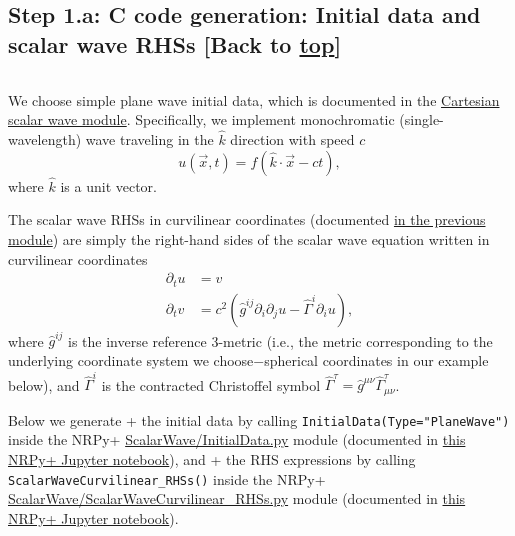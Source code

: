 \documentclass[landscape,letterpaper,10pt,english]{article}
\begin{document}
\[\label{writec}\]

    \hypertarget{step-1.a-c-code-generation-initial-data-and-scalar-wave-rhss-back-to-top}{%
\subsection{\texorpdfstring{Step 1.a: C code generation: Initial data
and scalar wave RHSs {[}Back to
\hyperref[toc]{top}{]}}{Step 1.a: C code generation: Initial data and scalar wave RHSs {[}Back to {]}}}\label{step-1.a-c-code-generation-initial-data-and-scalar-wave-rhss-back-to-top}}

\[\label{id_rhss}\]

We choose simple plane wave initial data, which is documented in the
\href{Tutorial-ScalarWave.ipynb}{Cartesian scalar wave module}.
Specifically, we implement monochromatic (single-wavelength) wave
traveling in the \(\hat{k}\) direction with speed \(c\)
\[u(\vec{x},t) = f(\hat{k}\cdot\vec{x} - c t),\] where \(\hat{k}\) is a
unit vector.

The scalar wave RHSs in curvilinear coordinates (documented
\href{Tutorial-ScalarWaveCurvilinear.ipynb}{in the previous module}) are
simply the right-hand sides of the scalar wave equation written in
curvilinear coordinates \begin{align}
\partial_t u &= v \\
\partial_t v &= c^2 \left(\hat{g}^{ij} \partial_{i} \partial_{j} u - \hat{\Gamma}^i \partial_i u\right),
\end{align} where \(\hat{g}^{ij}\) is the inverse reference 3-metric
(i.e., the metric corresponding to the underlying coordinate system we
choose\(-\)spherical coordinates in our example below), and
\(\hat{\Gamma}^i\) is the contracted Christoffel symbol
\(\hat{\Gamma}^\tau = \hat{g}^{\mu\nu} \hat{\Gamma}^\tau_{\mu\nu}\).

Below we generate + the initial data by calling
\texttt{InitialData(Type="PlaneWave")} inside the NRPy+
\href{../edit/ScalarWave/InitialData.py}{ScalarWave/InitialData.py}
module (documented in \href{Tutorial-ScalarWave.ipynb}{this NRPy+
Jupyter notebook}), and + the RHS expressions by calling
\texttt{ScalarWaveCurvilinear\_RHSs()} inside the NRPy+
\href{../edit/ScalarWave/ScalarWaveCurvilinear_RHSs.py}{ScalarWave/ScalarWaveCurvilinear\_RHSs.py}
module (documented in \href{Tutorial-ScalarWaveCurvilinear.ipynb}{this
NRPy+ Jupyter notebook}).
\end{document}
